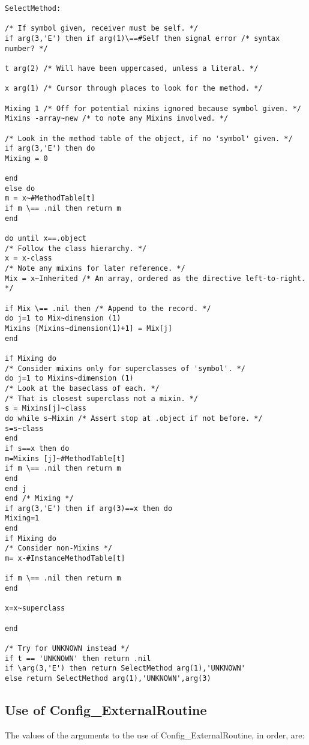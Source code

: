 \begin{verbatim}
SelectMethod:

/* If symbol given, receiver must be self. */
if arg(3,'E') then if arg(1)\==#Self then signal error /* syntax number? */

t arg(2) /* Will have been uppercased, unless a literal. */

x arg(1) /* Cursor through places to look for the method. */

Mixing 1 /* Off for potential mixins ignored because symbol given. */
Mixins -array~new /* to note any Mixins involved. */

/* Look in the method table of the object, if no 'symbol' given. */
if arg(3,'E') then do
Mixing = 0

end
else do
m = x~#MethodTable[t]
if m \== .nil then return m
end

do until x==.object
/* Follow the class hierarchy. */
x = x-class
/* Note any mixins for later reference. */
Mix = x~Inherited /* An array, ordered as the directive left-to-right. */

if Mix \== .nil then /* Append to the record. */
do j=1 to Mix~dimension (1)
Mixins [Mixins~dimension(1)+1] = Mix[j]
end

if Mixing do
/* Consider mixins only for superclasses of 'symbol'. */
do j=1 to Mixins~dimension (1)
/* Look at the baseclass of each. */
/* That is closest superclass not a mixin. */
s = Mixins[j]~class
do while s~Mixin /* Assert stop at .object if not before. */
s=s~class
end
if s==x then do
m=Mixins [j]~#MethodTable[t]
if m \== .nil then return m
end
end j
end /* Mixing */
if arg(3,'E') then if arg(3)==x then do
Mixing=1
end
if Mixing do
/* Consider non-Mixins */
m= x-#InstanceMethodTable[t]

if m \== .nil then return m
end

x=x~superclass

end

/* Try for UNKNOWN instead */
if t == 'UNKNOWN' then return .nil
if \arg(3,'E') then return SelectMethod arg(1),'UNKNOWN'
else return SelectMethod arg(1),'UNKNOWN',arg(3)
\end{verbatim}

\hypertarget{use-of-config_externalroutine}{%
\subsection{Use of
Config\_ExternalRoutine}\label{use-of-config_externalroutine}}

The values of the arguments to the use of Config\_ExternalRoutine, in
order, are:

